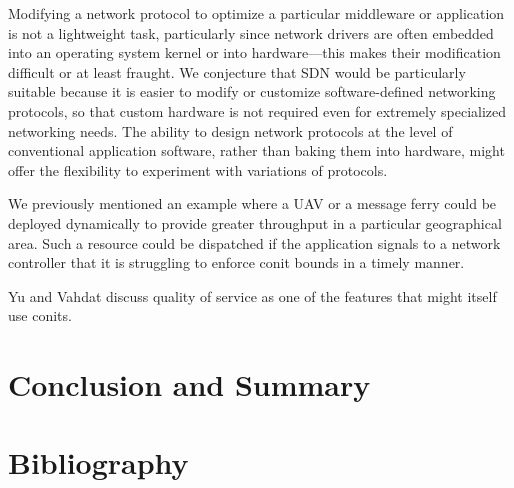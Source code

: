 \documentclass[]             %
{NASA}                       %
\theoremstyle{definition}
\begin{document}
Modifying a network protocol to optimize a particular middleware or
application is not a lightweight task, particularly since network
drivers are often embedded into an operating system kernel or into
hardware---this makes their modification difficult or at least
fraught. We conjecture that SDN would be particularly suitable because
it is easier to modify or customize software-defined networking
protocols, so that custom hardware is not required even for extremely
specialized networking needs. The ability to design network protocols
at the level of conventional application software, rather than baking
them into hardware, might offer the flexibility to experiment with
variations of protocols.

We previously mentioned an example where a UAV or a message ferry
could be deployed dynamically to provide greater throughput in a
particular geographical area. Such a resource could be dispatched if
the application signals to a network controller that it is struggling
to enforce conit bounds in a timely manner.

Yu and Vahdat discuss quality of service as one of the features that
might itself use conits.



\section{Conclusion and Summary}
\label{sec:conclusion}

\section*{Bibliography}\label{bibliography}



\end{document}
